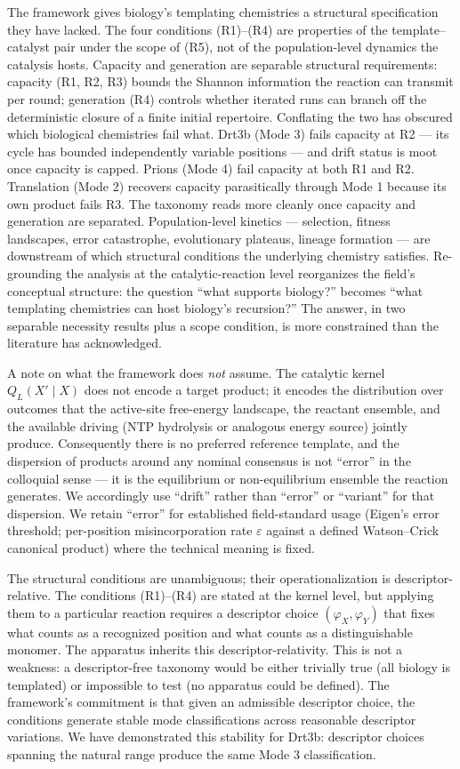 \documentclass[aps,prx,reprint,amsmath,amssymb,floatfix,superscriptaddress,nofootinbib]{revtex4-2}
\theoremstyle{plain-thm}
\theoremstyle{definition-thm}
\newcommand{\descX}{\varphi_X}
\newcommand{\descY}{\varphi_Y}
\begin{document}
The framework gives biology's templating chemistries a structural specification they have lacked. The four conditions (R1)--(R4) are properties of the template--catalyst pair under the scope of (R5), not of the population-level dynamics the catalysis hosts. Capacity and generation are separable structural requirements: capacity (R1, R2, R3) bounds the Shannon information the reaction can transmit per round; generation (R4) controls whether iterated runs can branch off the deterministic closure of a finite initial repertoire. Conflating the two has obscured which biological chemistries fail what. Drt3b (Mode 3) fails capacity at R2 --- its cycle has bounded independently variable positions --- and drift status is moot once capacity is capped. Prions (Mode 4) fail capacity at both R1 and R2. Translation (Mode 2) recovers capacity parasitically through Mode 1 because its own product fails R3. The taxonomy reads more cleanly once capacity and generation are separated. Population-level kinetics --- selection, fitness landscapes, error catastrophe, evolutionary plateaus, lineage formation --- are downstream of which structural conditions the underlying chemistry satisfies. Re-grounding the analysis at the catalytic-reaction level reorganizes the field's conceptual structure: the question ``what supports biology?'' becomes ``what templating chemistries can host biology's recursion?'' The answer, in two separable necessity results plus a scope condition, is more constrained than the literature has acknowledged.

A note on what the framework does \emph{not} assume. The catalytic kernel $Q_L(X' \mid X)$ does not encode a target product; it encodes the distribution over outcomes that the active-site free-energy landscape, the reactant ensemble, and the available driving (NTP hydrolysis or analogous energy source) jointly produce. Consequently there is no preferred reference template, and the dispersion of products around any nominal consensus is not ``error'' in the colloquial sense --- it is the equilibrium or non-equilibrium ensemble the reaction generates. We accordingly use ``drift'' rather than ``error'' or ``variant'' for that dispersion. We retain ``error'' for established field-standard usage (Eigen's error threshold; per-position misincorporation rate $\varepsilon$ against a defined Watson--Crick canonical product) where the technical meaning is fixed.

The structural conditions are unambiguous; their operationalization is descriptor-relative. The conditions (R1)--(R4) are stated at the kernel level, but applying them to a particular reaction requires a descriptor choice $(\descX, \descY)$ that fixes what counts as a recognized position and what counts as a distinguishable monomer. The apparatus inherits this descriptor-relativity. This is not a weakness: a descriptor-free taxonomy would be either trivially true (all biology is templated) or impossible to test (no apparatus could be defined). The framework's commitment is that given an admissible descriptor choice, the conditions generate stable mode classifications across reasonable descriptor variations. We have demonstrated this stability for Drt3b: descriptor choices spanning the natural range produce the same Mode 3 classification.
\end{document}
